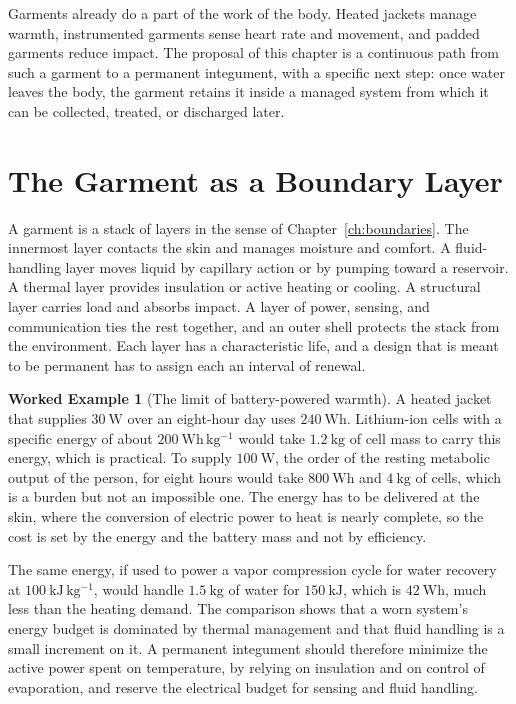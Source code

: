 \documentclass[11pt,openany]{book}
\theoremstyle{definition}
\newtheorem{example}{Worked Example}[chapter]
\theoremstyle{remark}
\begin{document}
Garments already do a part of the work of the body. Heated jackets manage warmth, instrumented garments sense heart rate and movement, and padded garments reduce impact. The proposal of this chapter is a continuous path from such a garment to a permanent integument, with a specific next step: once water leaves the body, the garment retains it inside a managed system from which it can be collected, treated, or discharged later.

\section{The Garment as a Boundary Layer}

A garment is a stack of layers in the sense of Chapter~\ref{ch:boundaries}. The innermost layer contacts the skin and manages moisture and comfort. A fluid-handling layer moves liquid by capillary action or by pumping toward a reservoir. A thermal layer provides insulation or active heating or cooling. A structural layer carries load and absorbs impact. A layer of power, sensing, and communication ties the rest together, and an outer shell protects the stack from the environment. Each layer has a characteristic life, and a design that is meant to be permanent has to assign each an interval of renewal.

\begin{example}[The limit of battery-powered warmth]
\label{ex:battery}
A heated jacket that supplies $30\ \mathrm{W}$ over an eight-hour day uses $240\ \mathrm{Wh}$. Lithium-ion cells with a specific energy of about $200\ \mathrm{Wh\,kg^{-1}}$ would take $1.2\ \mathrm{kg}$ of cell mass to carry this energy, which is practical. To supply $100\ \mathrm{W}$, the order of the resting metabolic output of the person, for eight hours would take $800\ \mathrm{Wh}$ and $4\ \mathrm{kg}$ of cells, which is a burden but not an impossible one. The energy has to be delivered at the skin, where the conversion of electric power to heat is nearly complete, so the cost is set by the energy and the battery mass and not by efficiency.

The same energy, if used to power a vapor compression cycle for water recovery at $100\ \mathrm{kJ\,kg^{-1}}$, would handle $1.5\ \mathrm{kg}$ of water for $150\ \mathrm{kJ}$, which is $42\ \mathrm{Wh}$, much less than the heating demand. The comparison shows that a worn system's energy budget is dominated by thermal management and that fluid handling is a small increment on it. A permanent integument should therefore minimize the active power spent on temperature, by relying on insulation and on control of evaporation, and reserve the electrical budget for sensing and fluid handling.
\end{example}
\end{document}
